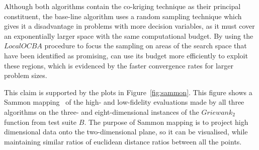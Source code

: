 Although both algorithms contain the co-kriging technique as their principal constituent, the base-line algorithm uses a random sampling technique which gives it a disadvantage in problems with more decision variables, as it must cover an exponentially larger space with the same computational budget. By using the $LocalOCBA$ procedure to focus the sampling on areas of the search space that have been identified as promising, \AlgName{} can use its budget more efficiently to exploit these regions, which is evidenced by the faster convergence rates for larger problem sizes. %

This claim is supported by the plots in Figure~\ref{fig:sammon}. This figure shows a Sammon mapping~\cite{sammon1969nonlinear} of the high- and low-fidelity evaluations made by all three algorithms on the three- and eight-dimensional instances of the $Griewank_2$ function from test suite $B$. The purpose of Sammon mapping is to project high dimensional data onto the two-dimensional plane, so it can be visualised, while maintaining similar ratios of euclidean distance ratios between all the points. 
\begin{figure*}[h!]
  \centering
  \quad {}
  \\
  \caption{Sammon mapping projection of samples onto the 2D plane for the Griewank function at $D=3$ and $D=8$. Points represent high- and low-fidelity samples, indicated by filled and un-filled circles, respectively; colour indicates solution quality, with red and blue being high and low, respectively; and the global optimum $\V{x}^*$ is indicated by the black cross.} 
    \label{fig:sammon}
\end{figure*}

